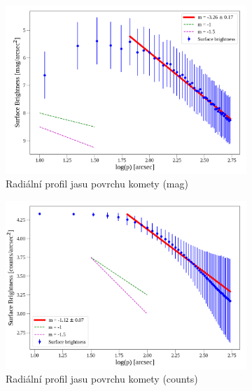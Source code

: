 \documentclass[a4paper,11pt,twocolumn]{article}
\begin{document}
    \begin{figure}%
        \centering
        \begin{subfigure}[t]{0.48\textwidth}
            \centering
            \includegraphics[width=\textwidth]{sbp.png}
            \caption{Radiální profil jasu povrchu komety (mag)}
            \label{fig:sbp}
        \end{subfigure}
        \hfill
        \begin{subfigure}[t]{0.48\textwidth}
            \centering
            \includegraphics[width=\textwidth]{sbp_counts.png}
            \caption{Radiální profil jasu povrchu komety (counts)}
            \label{fig:sbp_counts}
        \end{subfigure}
        \vspace{10pt}
        \begin{subfigure}[t]{0.48\textwidth}

\end{subfigure}
\end{figure}
\end{document}
